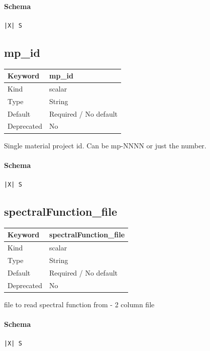 \documentclass[11pt]{article}
\begin{document}
{{{{{\paragraph{Schema}
\begin{Verbatim}
|X| S
\end{Verbatim}

\subsection{mp\_id}
\label{kw:mp-id}
\begin{longtable}{|p{1.5in}|p{4.5in}|}
\hline
Keyword & mp\_id \\
\hline
Kind & scalar \\
\hline
Type & String \\
\hline
Default & Required / No default \\
\hline
Deprecated & No \\
\hline
\end{longtable}
 Single material project id. Can be mp-NNNN or just the number.

\paragraph{Schema}
\begin{Verbatim}
|X| S
\end{Verbatim}

\subsection{spectralFunction\_file}
\label{kw:spectralFunction-file}
\begin{longtable}{|p{1.5in}|p{4.5in}|}
\hline
Keyword & spectralFunction\_file \\
\hline
Kind & scalar \\
\hline
Type & String \\
\hline
Default & Required / No default \\
\hline
Deprecated & No \\
\hline
\end{longtable}
 file to read spectral function from - 2 column file

\paragraph{Schema}
\begin{Verbatim}
|X| S
\end{Verbatim}

}}}}}
\end{document}
